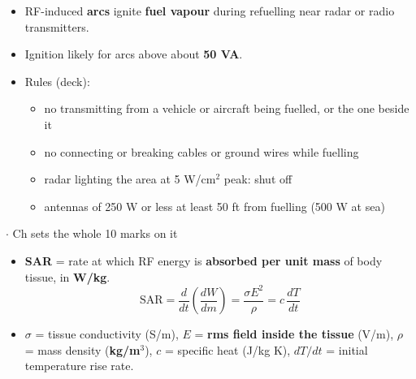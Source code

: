 \begin{minipage}[t]{0.33\textwidth}\vspace{0pt}\raggedright
{}
\begin{itemize}
  \item RF-induced \textbf{arcs} ignite \textbf{fuel vapour} during refuelling near radar or
    radio transmitters.
  \item Ignition likely for arcs above about \textbf{50 VA}.
  \item Rules (deck):
  \begin{itemize}
    \item no transmitting from a vehicle or aircraft being fuelled, or the one beside it
    \item no connecting or breaking cables or ground wires while fuelling
    \item radar lighting the area at 5 W/cm$^2$ peak: shut off
    \item antennas of 250 W or less at least 50 ft from fuelling (500 W at sea)
  \end{itemize}
\end{itemize}\end{minipage}\par

\vspace{2pt}


{\color{sub}\footnotesize {}  \gap$\cdot$ Ch sets the whole 10 marks on it}

\begin{itemize}
  \item \textbf{SAR} = rate at which RF energy is \textbf{absorbed per unit mass} of body
    tissue, in \textbf{W/kg}.
    \[ \boxed{\mathrm{SAR} = \frac{d}{dt}\left(\frac{dW}{dm}\right) = \frac{\sigma E^2}{\rho} = c\,\frac{dT}{dt}} \]
  \item $\sigma$ = tissue conductivity (S/m), $E$ = \textbf{rms field inside the tissue}
    (V/m), $\rho$ = mass density (\textbf{kg/m$^3$}), $c$ = specific heat (J/kg K),
    $dT/dt$ = initial temperature rise rate.
\end{itemize}

